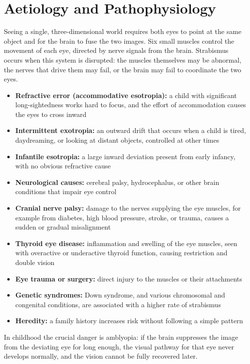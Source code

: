 \section*{Aetiology and Pathophysiology}
Seeing a single, three-dimensional world requires both eyes to point at the same object and for the brain to fuse the two images. Six small muscles control the movement of each eye, directed by nerve signals from the brain. Strabismus occurs when this system is disrupted: the muscles themselves may be abnormal, the nerves that drive them may fail, or the brain may fail to coordinate the two eyes.

\begin{itemize}
    \item \textbf{Refractive error (accommodative esotropia):} a child with significant long-sightedness works hard to focus, and the effort of accommodation causes the eyes to cross inward
    \item \textbf{Intermittent exotropia:} an outward drift that occurs when a child is tired, daydreaming, or looking at distant objects, controlled at other times
    \item \textbf{Infantile esotropia:} a large inward deviation present from early infancy, with no obvious refractive cause
    \item \textbf{Neurological causes:} cerebral palsy, hydrocephalus, or other brain conditions that impair eye control
    \item \textbf{Cranial nerve palsy:} damage to the nerves supplying the eye muscles, for example from diabetes, high blood pressure, stroke, or trauma, causes a sudden or gradual misalignment
    \item \textbf{Thyroid eye disease:} inflammation and swelling of the eye muscles, seen with overactive or underactive thyroid function, causing restriction and double vision
    \item \textbf{Eye trauma or surgery:} direct injury to the muscles or their attachments
    \item \textbf{Genetic syndromes:} Down syndrome, and various chromosomal and congenital conditions, are associated with a higher rate of strabismus
    \item \textbf{Heredity:} a family history increases risk without following a simple pattern
\end{itemize}

In childhood the crucial danger is amblyopia: if the brain suppresses the image from the deviating eye for long enough, the visual pathway for that eye never develops normally, and the vision cannot be fully recovered later.


